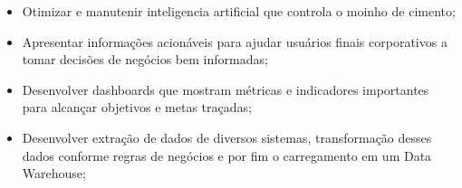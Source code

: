 \documentclass[10pt,a4paper,ragged2e]{altacv}
\begin{document}
\vspace{10px}

\begin{comment}
\begin{itemize}
    \item Otimizar e manutenir inteligencia artificial que controla o moinho de cimento;
    \item Apresentar informações acionáveis para ajudar usuários finais corporativos a tomar decisões de negócios bem informadas.
\end{itemize}
\cvtag{Python} 
\cvtag{PostgreSQL}
\cvtag{ETL}
\cvtag{Qlik Sense}
\cvtag{Data visualization}
\cvtag{Mineração de dados}
\cvtag{Business Intelligence}
\end{comment}

\vspace{10px}

\begin{itemize}
    \item Otimizar e manutenir inteligencia artificial que controla o moinho de cimento;
    \item Apresentar informações acionáveis para ajudar usuários finais corporativos a tomar decisões de negócios bem informadas;
    \item Desenvolver dashboards que mostram métricas e indicadores importantes para alcançar objetivos e metas traçadas;
    \item Desenvolver extração de dados de diversos sistemas, transformação desses dados conforme regras de negócios e por fim o carregamento em um Data Warehouse;
\end{itemize}

\vspace{10px}
\end{document}
